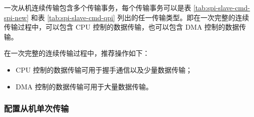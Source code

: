 \documentclass[main\_\_CN.tex]{subfiles}
\begin{document}
一次从机连续传输包含多个传输事务，每个传输事务可以是表 \ref{tab:spi-slave-cmd-spi-new} 和表 \ref{tab:spi-slave-cmd-qpi} 列出的任一传输类型。即在一次完整的连续传输过程中，可以包含 CPU 控制的数据传输，也可以包含 DMA 控制的数据传输。

在一次完整的连续传输过程中，推荐操作如下：

\begin{itemize}
    \item CPU 控制的数据传输可用于握手通信以及少量数据传输；

    \item DMA 控制的数据传输可用于大量数据传输。
\end{itemize}


\subsubsection{配置从机单次传输}\label{GP-SPI2 slave single transfer}
\end{document}
